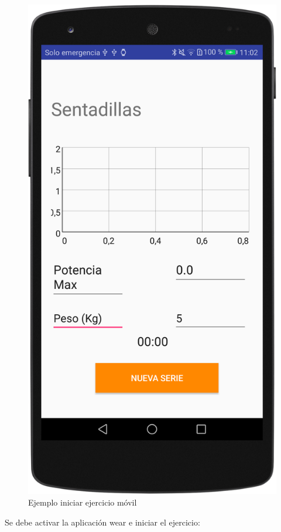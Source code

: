 \begin{figure}[H]
	\centering
	\includegraphics[scale=0.10]{imagenes/m6.png}
	\caption{Ejemplo iniciar ejercicio móvil}
	\label{Realización ejercicio 4}
\end{figure}

Se debe activar la aplicación wear e iniciar el ejercicio:

